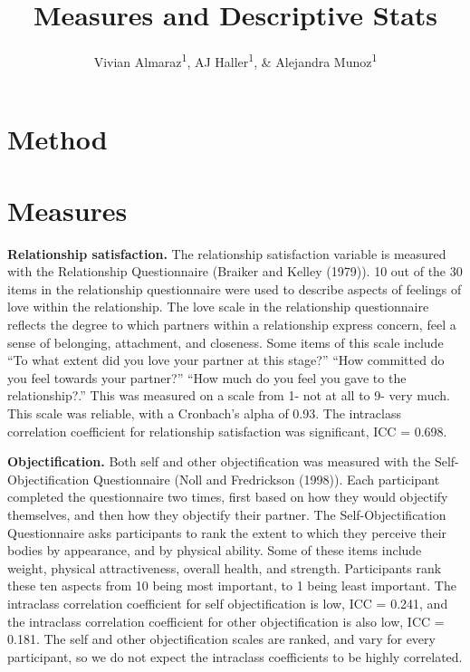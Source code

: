 \documentclass[
  man]{apa6}
\title{Measures and Descriptive Stats}
\author{Vivian Almaraz\textsuperscript{1}, AJ Haller\textsuperscript{1}, \& Alejandra Munoz\textsuperscript{1}}
\date{}
\affiliation{\vspace{0.5cm}\textsuperscript{1} Smith College}
\begin{document}
\maketitle

\hypertarget{method}{%
\section{Method}\label{method}}

\hypertarget{measures}{%
\section{Measures}\label{measures}}

\textbf{Relationship satisfaction.} The relationship satisfaction variable is measured with the Relationship Questionnaire (Braiker and Kelley (1979)). 10 out of the 30 items in the relationship questionnaire were used to describe aspects of feelings of love within the relationship. The love scale in the relationship questionnaire reflects the degree to which partners within a relationship express concern, feel a sense of belonging, attachment, and closeness. Some items of this scale include ``To what extent did you love your partner at this stage?'' ``How committed do you feel towards your partner?'' ``How much do you feel you gave to the relationship?.'' This was measured on a scale from 1- not at all to 9- very much. This scale was reliable, with a Cronbach's alpha of 0.93. The intraclass correlation coefficient for relationship satisfaction was significant, ICC = 0.698.

\textbf{Objectification.} Both self and other objectification was measured with the Self-Objectification Questionnaire (Noll and Fredrickson (1998)). Each participant completed the questionnaire two times, first based on how they would objectify themselves, and then how they objectify their partner. The Self-Objectification Questionnaire asks participants to rank the extent to which they perceive their bodies by appearance, and by physical ability. Some of these items include weight, physical attractiveness, overall health, and strength. Participants rank these ten aspects from 10 being most important, to 1 being least important. The intraclass correlation coefficient for self objectification is low, ICC = 0.241, and the intraclass correlation coefficient for other objectification is also low, ICC = 0.181. The self and other objectification scales are ranked, and vary for every participant, so we do not expect the intraclass coefficients to be highly correlated.
\end{document}
